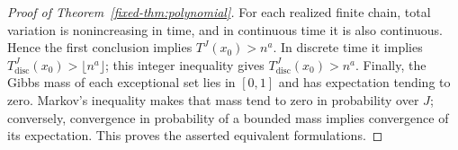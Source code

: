 \begin{proof}[Proof of Theorem~\ref{fixed-thm:polynomial}]
For each realized finite chain, total variation is nonincreasing in
time, and in continuous time it is also continuous. Hence the first
conclusion implies $T^J(x_0)>n^a$. In discrete time it implies
$T_{\mathrm{disc}}^J(x_0)>\lfloor n^a\rfloor$; this integer inequality
gives $T_{\mathrm{disc}}^J(x_0)>n^a$. Finally, the Gibbs mass of each
exceptional set lies in $[0,1]$ and has expectation tending to zero.
Markov's inequality makes that mass tend to zero in probability over
$J$; conversely, convergence in probability of a bounded mass implies
convergence of its expectation. This proves the asserted equivalent
formulations.
\end{proof}
